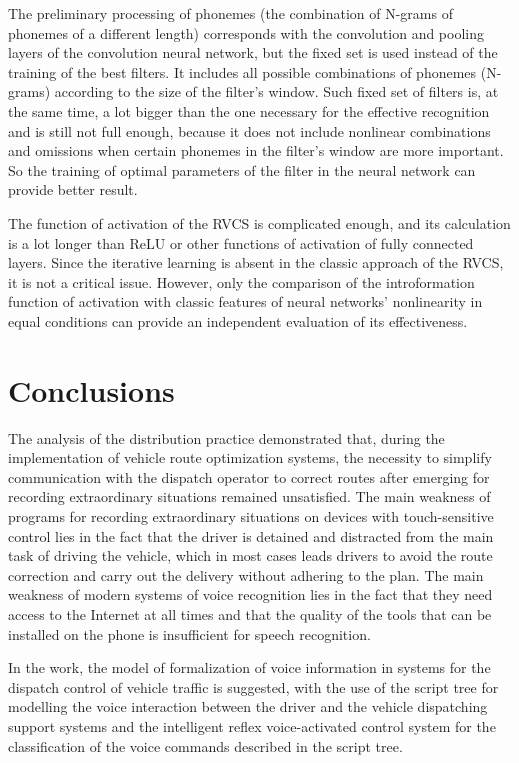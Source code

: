 \documentclass[review,authoryear]{elsarticle}
\begin{document}
The preliminary processing of phonemes (the combination of N-grams of phonemes of a different length) corresponds with the convolution and pooling layers of the convolution neural network, but the fixed set is used instead of the training of the best filters. It includes all possible combinations of phonemes (N-grams) according to the size of the filter’s window. Such fixed set of filters is, at the same time, a lot bigger than the one necessary for the effective recognition and is still not full enough, because it does not include nonlinear combinations and omissions when certain phonemes in the filter’s window are more important. So the training of optimal parameters of the filter in the neural network can provide better result. 

The function of activation of the RVCS is complicated enough, and its calculation is a lot longer than ReLU or other functions of activation of fully connected layers. Since the iterative learning is absent in the classic approach of the RVCS, it is not a critical issue. However, only the comparison of the introformation function of activation with classic features of neural networks’ nonlinearity in equal conditions can provide an independent evaluation of its effectiveness. 

\section{Conclusions} \label{sec:conclusions}

The analysis of the distribution practice demonstrated that, during the implementation of vehicle route optimization systems, the necessity to simplify communication with the dispatch operator to correct routes after emerging for recording extraordinary situations remained unsatisfied. The main weakness of programs for recording extraordinary situations on devices with touch-sensitive control lies in the fact that the driver is detained and distracted from the main task of driving the vehicle, which in most cases leads drivers to avoid the route correction and carry out the delivery without adhering to the plan. The main weakness of modern systems of voice recognition lies in the fact that they need access to the Internet at all times and that the quality of the tools that can be installed on the phone is insufficient for speech recognition. 

In the work, the model of formalization of voice information in systems for the dispatch control of vehicle traffic is suggested, with the use of the script tree for modelling the voice interaction between the driver and the vehicle dispatching support systems and the intelligent reflex voice-activated control system  for the classification of the voice commands described in the script tree.
\end{document}
